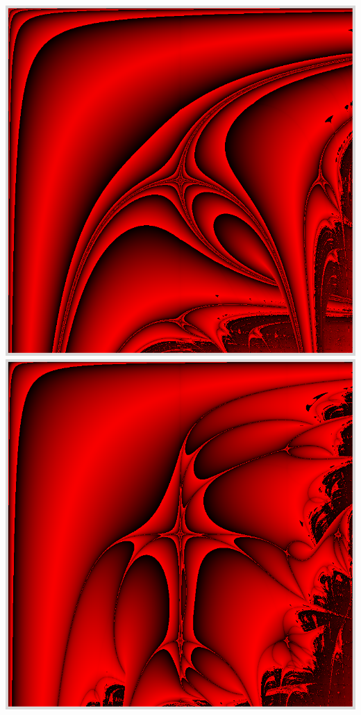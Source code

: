 \documentclass[11pt,class=report,crop=false]{standalone}
\begin{document}
\begin{activite}
\begin{center}
\includegraphics[scale=\myscale,scale=0.15]{ecran-lyapunov-AB}\quad
\includegraphics[scale=\myscale,scale=0.15]{ecran-lyapunov-AAABB}\quad

\end{center}
\end{activite}
\end{document}
